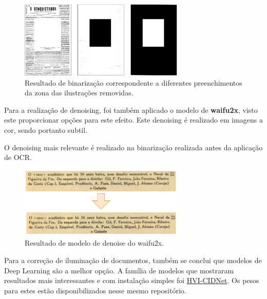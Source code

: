\begin{figure}[H]
	\centering
	\includegraphics[width=0.7\textwidth]{images/ilustracoes/binarize_remove_images_example.png}
	\caption{Resultado de binarização correspondente a diferentes preenchimentos da zona das ilustrações removidas.}
	\label{fig:binarize_remove_images_example}
\end{figure}


Para a realização de denoising, foi também aplicado o modelo de \textbf{waifu2x}, visto este proporcionar opções para este efeito. Este denoising é realizado em imagens a cor, sendo portanto subtil.

O denoising mais relevante é realizado na binarização realizada antes da aplicação de OCR.

\begin{figure}[H]
	\centering
	\includegraphics[width=0.7\textwidth]{images/ilustracoes/denoise_example.png}
	\caption{Resultado de modelo de denoise do waifu2x.}
	\label{fig:denoise_example}
\end{figure}




Para a correção de iluminação de documentos, também se conclui que modelos de Deep Learning são a melhor opção. A família de modelos que mostraram resultados mais interessantes e com instalação simples foi \href{https://github.com/Fediory/HVI-CIDNet}{HVI-CIDNet}. Os pesos para estes estão disponibilizados nesse mesmo repositório.

